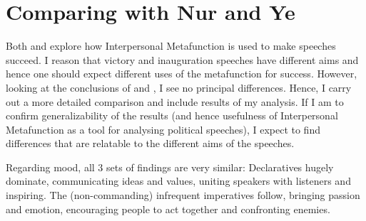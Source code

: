 \documentclass[11pt]{article}
\begin{document}
\section{Comparing with Nur and Ye}{
	\label{sec:comparison}
	Both \citeauthor{Nur} and \citeauthor{Ye} explore how Interpersonal Metafunction is used to make speeches succeed.
	I reason that victory and inauguration speeches have different aims and hence one should expect different uses of the metafunction for success.
	However, looking at the conclusions of \citeauthor{Nur} and \citeauthor{Ye}, I see no principal differences.
	Hence, I carry out a more detailed comparison and include results of my analysis. If I am to confirm generalizability of the results (and hence usefulness of Interpersonal Metafunction as a tool for analysing political speeches), I expect to find differences that are relatable to the different aims of the speeches.

	
	Regarding mood, all 3 sets of findings are very similar: Declaratives hugely dominate, communicating ideas and values, uniting speakers with listeners and inspiring. The (non-commanding) infrequent imperatives follow, bringing passion and emotion, encouraging people to act together and confronting enemies.

}
\end{document}

